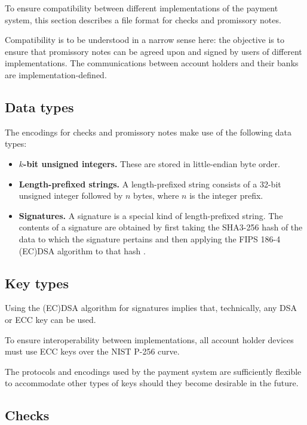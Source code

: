 \documentclass[12pt,a4paper]{article}
\begin{document}
\begin{multicols}{2}
	To ensure compatibility between different implementations of the payment system, this section describes a file format for checks and promissory notes.
	
	Compatibility is to be understood in a narrow sense here: the objective is to ensure that promissory notes can be agreed upon and signed by users of different implementations. The communications between account holders and their banks are implementation-defined.
	
	\subsection{Data types}
	
	The encodings for checks and promissory notes make use of the following data types:
	
	\begin{itemize}
		\item \textbf{$k$-bit unsigned integers.} These are stored in little-endian byte order.
		
		\item \textbf{Length-prefixed strings.} A length-prefixed string consists of a 32-bit unsigned integer followed by $n$ bytes, where $n$ is the integer prefix.
		
		\item \textbf{Signatures.} A signature is a special kind of length-prefixed string. The contents of a signature are obtained by first taking the SHA3-256 hash of the data to which the signature pertains and then applying the FIPS 186-4 (EC)DSA algorithm to that hash \cite{fips-202-sha3, fips-186-4-dss}.

	\end{itemize}

	\subsection{Key types}

	Using the (EC)DSA algorithm for signatures implies that, technically, any DSA or ECC key can be used.
	
	To ensure interoperability between implementations, all account holder devices must use ECC keys over the NIST P-256 curve.

	The protocols and encodings used by the payment system are sufficiently flexible to accommodate other types of keys should they become desirable in the future.

	\subsection{Checks}
	

\end{multicols}
\end{document}
